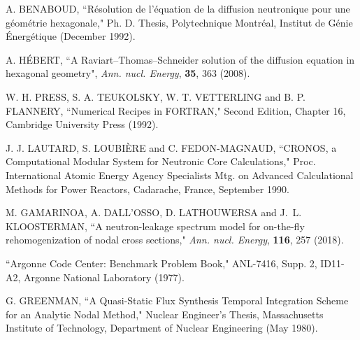 \begin{thebibliography}{99}
A. BENABOUD, ``R\'esolution de l'\'equation de la diffusion neutronique pour une g\'eom\'etrie hexagonale," Ph. D. Thesis, Polytechnique Montr\'eal, Institut de G\'enie \'Energ\'etique (December 1992).

A. H\'EBERT, ``A Raviart--Thomas--Schneider solution of the diffusion equation in hexagonal geometry", {\sl Ann. nucl. Energy},
{\bf 35}, 363 (2008).

W. H. PRESS, S. A. TEUKOLSKY, W. T. VETTERLING and B. P. FLANNERY, ``Numerical Recipes in FORTRAN," Second Edition, Chapter 16, Cambridge University Press (1992).

J. J. LAUTARD, S. LOUBI\`ERE and C. FEDON-MAGNAUD, ``CRONOS, a Computational Modular System for Neutronic Core Calculations," Proc. International Atomic Energy Agency Specialists Mtg. on Advanced Calculational Methods for Power Reactors, Cadarache, France, September 1990.

M. GAMARINOA, A. DALL'OSSO, D. LATHOUWERSA and J.~L. KLOOSTERMAN, ``A neutron-leakage spectrum model for on-the-fly rehomogenization of nodal cross sections," {\sl Ann. nucl. Energy},
{\bf 116}, 257 (2018).

``Argonne Code Center: Benchmark Problem Book," ANL-7416, Supp. 2, ID11-A2, Argonne National Laboratory (1977).

G. GREENMAN, ``A Quasi-Static Flux Synthesis Temporal Integration Scheme for an Analytic Nodal Method," Nuclear Engineer's Thesis, Massachusetts Institute of Technology, Department of Nuclear Engineering (May 1980).

\end{thebibliography}
